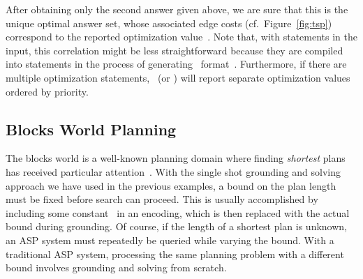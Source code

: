 %
After obtaining only the second answer given above,
we are sure that this is the unique optimal answer set,
whose associated edge costs (cf.\ Figure~\ref{fig:tsp}) correspond to
the reported optimization value~.
Note that, with  statements in the input, this correlation
might be less straightforward because they are compiled into 
statements in the process of generating \smodels\ format~\cite{lparseManual}.
Furthermore, if there are multiple optimization statements,
\clasp\ (or \clingo) will report separate optimization values ordered by priority.

\subsection{Blocks World Planning}\label{subsec:ex:block}

The blocks world is a well-known planning domain
where finding \emph{shortest} plans has received particular attention~\cite{gupnau92a}.
With the single shot grounding and solving approach we have used in the previous examples,
a bound on the plan length must be fixed before search can proceed.
This is usually accomplished by including some constant~
in an encoding, which is then replaced with the actual bound during grounding.
Of course, if the length of a shortest plan is unknown,
an ASP system must repeatedly be queried while varying the bound.
With a traditional ASP system, processing
the same planning problem with a different bound
involves grounding and solving from scratch.

